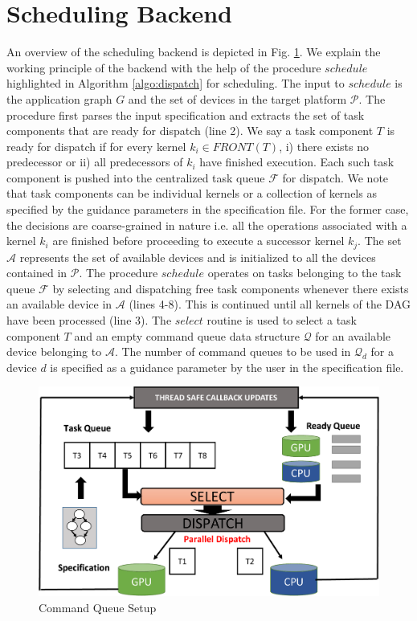     \section{Scheduling Backend}
    An overview of the scheduling backend is depicted in Fig. \ref{fig:schedbackend}. We explain the working principle of the backend with the help of the procedure $schedule$ highlighted in Algorithm \ref{algo:dispatch} for scheduling. The input to $schedule$ is the application graph $G$ and the set of devices in the target platform $\mathcal{P}$. The procedure first parses the input specification and extracts the set of task components that are ready for dispatch (line 2). We say a task component $T$ is ready for dispatch if for every kernel $k_i \in FRONT(T)$, i) there exists no predecessor or ii) all predecessors of $k_i$ have finished execution. Each such task component is pushed into the centralized task queue $\mathcal{F}$ for dispatch. We note that task components can be individual kernels or a collection of kernels as specified by the guidance parameters in the specification file. For the former case, the decisions are coarse-grained in nature i.e. all the operations associated with a kernel $k_i$ are finished before proceeding to execute a successor kernel $k_j$.
    The set $\mathcal{A}$ represents the set of available devices and is initialized to all the devices contained in $\mathcal{P}$. The procedure $schedule$ operates on tasks belonging to the task queue $\mathcal{F}$ by selecting and dispatching free task components whenever there exists an available device in $\mathcal{A}$ (lines 4-8). This is continued until all kernels of the DAG have been processed (line 3). The $select$ routine is used to select a task component $T$ and an empty command queue data structure $\mathcal{Q}$ for an available device belonging to $\mathcal{A}$. The number of command queues to be used in $\mathcal{Q}_d$ for a device $d$ is specified as a guidance parameter by the user in the specification file. 
	\begin{figure}[ht]
		\centering
		\includegraphics[scale=0.35]{Pictures/SchedulingEngine.pdf}
		\caption{\small Command Queue Setup\label{fig:schedbackend}}
	\end{figure}
